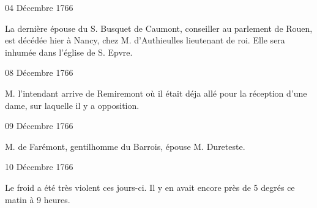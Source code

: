                      \begin{diary}{04 Décembre 1766}{}
                        
                        
                           La dernière épouse du S. Busquet de Caumont,
                           conseiller au parlement de
                              Rouen, est décédée
                           hier à Nancy, chez
                           M. d’Authieulles
                           lieutenant de
                           roi. Elle sera inhumée dans l’église
                              de S. Epvre.
                        \bigskip
        
        
                     \end{diary}
                     
                     

                     \begin{diary}{08 Décembre 1766}{}
                        
                        
                           M. l’intendant arrive de Remiremont
                           où il était déja allé pour la réception d’une
                           dame, sur laquelle il y a opposition. \bigskip
        
        
                     \end{diary}

                     \begin{diary}{09 Décembre 1766}{}
                        
                        
                           M. de Farémont, gentilhomme du
                              Barrois,
                           épouse M.
                              Dureteste. \bigskip
        
        
                     \end{diary}

                     \begin{diary}{10 Décembre 1766}{}
                        
                         Le froid a été très violent ces
                           jours-ci.
                           Il y en avait encore près de 5 degrés
                           ce matin à 9
                              heures. \bigskip
        
        
                     \end{diary}

